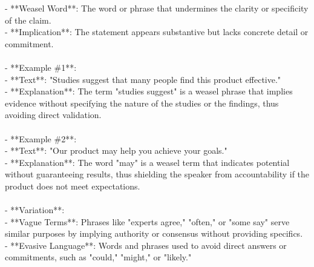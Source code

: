 \documentclass[a4paper,12pt,single,pdftex]{scrartcl}
\begin{document}
    
        - **Weasel Word**: The word or phrase that undermines the clarity or specificity of the claim.
    \\

    
        - **Implication**: The statement appears substantive but lacks concrete detail or commitment.
    \\

    
      
    \\

    
      - **Example \#1**:
    \\

    
        - **Text**: "Studies suggest that many people find this product effective."
    \\

    
        - **Explanation**: The term "studies suggest" is a weasel phrase that implies evidence without specifying the nature of the studies or the findings, thus avoiding direct validation.
    \\

    
      
    \\

    
      - **Example \#2**:
    \\

    
        - **Text**: "Our product may help you achieve your goals."
    \\

    
        - **Explanation**: The word "may" is a weasel term that indicates potential without guaranteeing results, thus shielding the speaker from accountability if the product does not meet expectations.
    \\

    
      
    \\

    
      - **Variation**:
    \\

    
        - **Vague Terms**: Phrases like "experts agree," "often," or "some say" serve similar purposes by implying authority or consensus without providing specifics.
    \\

    
        - **Evasive Language**: Words and phrases used to avoid direct answers or commitments, such as "could," "might," or "likely."
    \\

    
      
\end{document}
